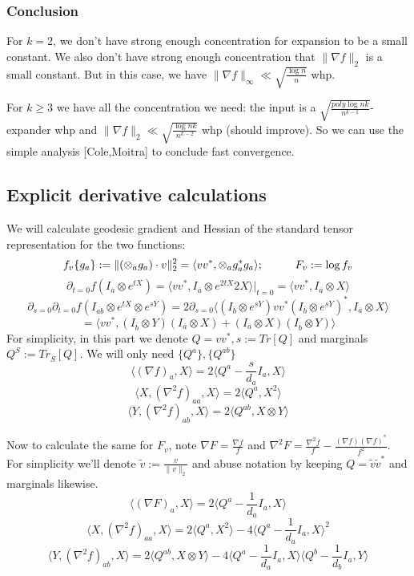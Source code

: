 \documentclass{article}
\begin{document}
\subsubsection{Conclusion}
For $k=2$, we don't have strong enough concentration for expansion to be a small constant. We also don't have strong enough concentration that $\|\nabla f\|_{2}$ is a small constant. But in this case, we have $\|\nabla f\|_{\infty} \ll \sqrt{\frac{\log n}{n}}$ whp. 

For $k \geq 3$ we have all the concentration we need: the input is a $\sqrt{\frac{poly\log nk}{n^{k-1}}}$-expander whp and $\|\nabla f\|_{2} \ll \sqrt{\frac{\log nk}{n^{k-2}}}$ whp (should improve). So we can use the simple analysis [Cole,Moitra] to conclude fast convergence. 


\subsection{Explicit derivative calculations}
We will calculate geodesic gradient and Hessian of the standard tensor representation for the two functions:
\[ f_{v}\{g_{a}\} := \|(\otimes_{a} g_{a}) \cdot v\|_{2}^{2} = \langle v v^{*},\otimes_{a} g_{a}^{*} g_{a} \rangle ; \hspace{10mm}  F_{v} := \log f_{v}  \]
\[ \partial_{t=0} f(I_{\overline{a}} \otimes e^{tX}) = \langle v v^{*}, I_{\overline{a}} \otimes e^{2tX} 2 X \rangle |_{t=0} = \langle v v^{*}, I_{\overline{a}} \otimes X \rangle   \]
\[ \partial_{s=0} \partial_{t=0} f(I_{\overline{ab}} \otimes e^{tX} \otimes e^{sY}) = 2 \partial_{s=0} \langle (I_{\overline{b}} \otimes e^{sY}) v v^{*} (I_{\overline{b}} \otimes e^{sY})^{*}, I_{\overline{a}} \otimes X \rangle \]
\[ = \langle v v^{*}, (I_{\overline{b}} \otimes Y) (I_{\overline{a}} \otimes X) + (I_{\overline{a}} \otimes X) (I_{\overline{b}} \otimes Y) \rangle
\]
For simplicity, in this part we denote $Q = v v^{*}, s := Tr[Q]$ and marginals $Q^{S} := Tr_{\overline{S}}[Q]$. We will only need $\{Q^{a}\},\{Q^{ab}\}$
\[ \langle (\nabla f)_{a}, X \rangle = 2 \langle Q^{a} - \frac{s}{d_{a}} I_{a}, X \rangle  \]
\[ \langle X, (\nabla^{2} f)_{aa}, X \rangle = 2 \langle Q^{a}, X^{2} \rangle   \]
\[ \langle Y, (\nabla^{2} f)_{ab}, X \rangle = 2 \langle Q^{ab}, X \otimes Y \rangle   \]

Now to calculate the same for $F_{v}$, note $\nabla F = \frac{\nabla f}{f}$ and $\nabla^{2} F = \frac{\nabla^{2} f}{f} - \frac{(\nabla f)(\nabla f)^{*}}{f^{2}}$. For simplicity we'll denote $\tilde{v} := \frac{v}{\|v\|_{2}}$ and abuse notation by keeping $Q = \tilde{v} \tilde{v}^{*}$ and marginals likewise. 
\[ \langle (\nabla F)_{a}, X \rangle = 2 \langle Q^{a} - \frac{1}{d_{a}} I_{a}, X \rangle   \]
\[ \langle X, (\nabla^{2} f)_{aa}, X \rangle = 2 \langle Q^{a}, X^{2} \rangle - 4 \langle Q^{a} - \frac{1}{d_{a}} I_{a}, X \rangle^{2} \]
\[ \langle Y, (\nabla^{2} f)_{ab}, X \rangle = 2 \langle Q^{ab}, X \otimes Y \rangle  - 4 \langle Q^{a} - \frac{1}{d_{a}} I_{a}, X \rangle \langle Q^{b} - \frac{1}{d_{b}} I_{a}, Y \rangle  \]
\end{document}
